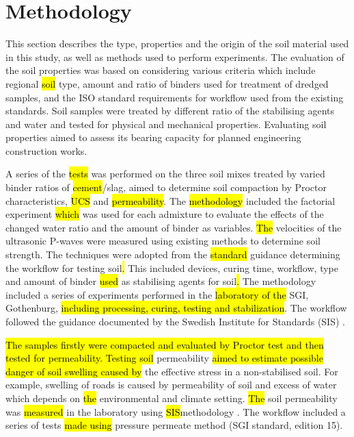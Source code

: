 \documentclass{amestyle}
\begin{document}

\section{Methodology}
This section describes the type, properties and the origin of the soil material used in this study, as well as methods used to perform experiments. The evaluation of the soil properties was based on considering various criteria which include regional \hl{soil }type, amount and ratio of binders used for treatment of dredged samples, and the ISO standard requirements for workflow used from the existing standards. Soil samples were treated by different ratio of the stabilising agents and water and tested for physical and mechanical properties. Evaluating soil properties aimed to assess its bearing capacity for planned engineering construction works.

A series of the \hl{tests} was performed on the three soil mixes treated by varied binder ratios of \hl{cement}/slag, aimed to determine soil compaction by Proctor characteristics, \hl{UCS} and \hl{permeability}. The \hl{methodology} included the factorial experiment \hl{which} was used for each admixture to evaluate the effects of the changed water ratio and the amount of binder as variables. \hl{The} velocities of the ultrasonic P-waves were measured using existing\hl{ }methods \cite{Lindh202102} to determine soil strength. The techniques were adopted from the \hl{standard} guidance determining the workflow for testing soil\hl{. }This included devices, curing time, workflow, type and amount of binder \hl{used} as stabilising agents for soil\hl{. }The methodology included a series of experiments performed \hl{ }in the \hl{laboratory of the }SGI, Gothenburg, \hl{including processing, curing, testing and stabilization}. The workflow followed the guidance documented by the Swedish Institute for Standards (SIS) \cite{SIS2017,SIS2018,SIS2019}. 

\hl{The samples firstly were compacted and evaluated by Proctor test and then tested for permeability. Testing soil} permeability \hl{aimed to estimate possible danger of soil swelling caused by} the effective stress in a non-stabilised soil. For example, swelling of roads is caused by permeability of soil and excess of water which depends on \hl{the }environmental and climate\hl{ }setting. \hl{The }soil permeability was \hl{measured} in the laboratory using\hl{ SIS}methodology \cite{SIS2019}. The workflow included a series of tests \hl{made using} pressure permeate method (SGI standard, edition 15).
\end{document}
